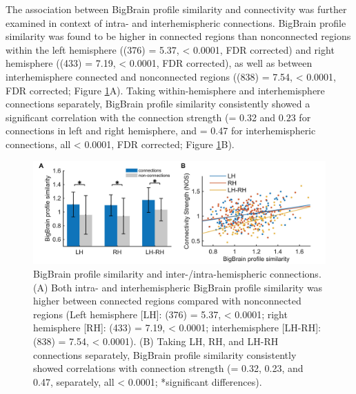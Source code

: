 \begin{refsection}
The association between BigBrain profile similarity and connectivity was further examined in context of intra- and interhemispheric connections. BigBrain profile similarity was found to be higher in connected regions than nonconnected regions within the left hemisphere (\tvaldf(376) = 5.37, \pval < 0.0001, FDR corrected) and right hemisphere (\tvaldf(433) = 7.19, \pval < 0.0001, FDR corrected), as well as between interhemisphere connected and nonconnected regions (\tvaldf(838) = 7.54, \pval < 0.0001, FDR corrected; Figure \ref{bigbrainFig4}A). Taking within-hemisphere and interhemisphere connections separately, BigBrain profile similarity consistently showed a significant correlation with the connection strength (\rval = 0.32 and $0.23$ for connections in left and right hemisphere, and \rval = 0.47 for interhemispheric connections, all \pval < 0.0001, FDR corrected; Figure \ref{bigbrainFig4}B).

\begin{figure}[h]
    \centering
    \includegraphics[width=\linewidth]{images/thesis_bb_fig4.jpg}
    \caption{BigBrain profile similarity and inter-/intra-hemispheric connections. (A) Both intra- and interhemispheric BigBrain profile similarity was higher between connected regions compared with nonconnected regions (Left hemisphere [LH]: \tvaldf(376) = 5.37, \pval < 0.0001; right hemisphere [RH]: \tvaldf(433) = 7.19, \pval < 0.0001; interhemisphere [LH-RH]: \tvaldf(838) = 7.54, \pval < 0.0001). (B) Taking LH, RH, and LH-RH connections separately, BigBrain profile similarity consistently showed correlations with connection strength (\rval = 0.32, 0.23, and 0.47, separately, all \pval < 0.0001; *significant differences).}
    \label{bigbrainFig4}
\end{figure}


\end{refsection}
